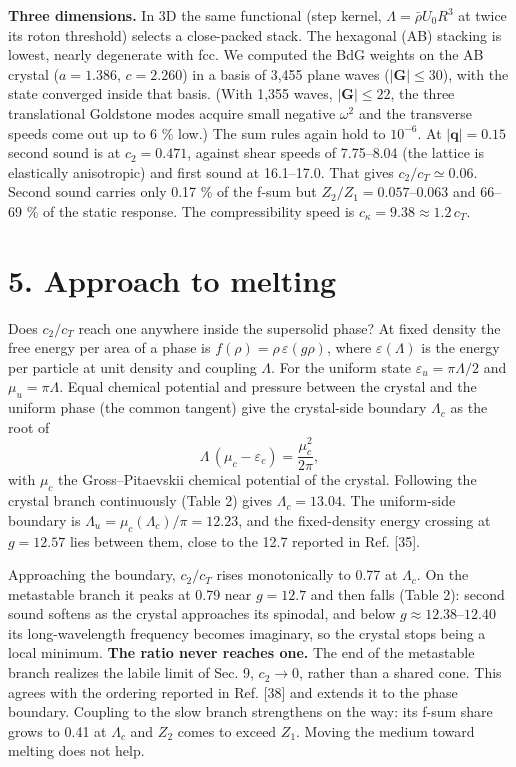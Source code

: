 \documentclass[
  11pt,
]{article}
\begin{document}
\textbf{Three dimensions.} In 3D the same functional (step kernel,
\(\Lambda=\bar\rho U_0R^3\) at twice its roton threshold) selects a
close-packed stack. The hexagonal (AB) stacking is lowest, nearly
degenerate with fcc. We computed the BdG weights on the AB crystal
(\(a=1.386\), \(c=2.260\)) in a basis of 3,455 plane waves
(\(|\mathbf G|\le30\)), with the state converged inside that basis.
(With 1,355 waves, \(|\mathbf G|\le22\), the three translational
Goldstone modes acquire small negative \(\omega^2\) and the transverse
speeds come out up to 6 \% low.) The sum rules again hold to
\(10^{-6}\). At \(|\mathbf q|=0.15\) second sound is at \(c_2=0.471\),
against shear speeds of 7.75--8.04 (the lattice is elastically
anisotropic) and first sound at 16.1--17.0. That gives
\(c_2/c_T\simeq0.06\). Second sound carries only 0.17 \% of the f-sum
but \(Z_2/Z_1=0.057\)--\(0.063\) and 66--69 \% of the static response.
The compressibility speed is \(c_\kappa=9.38\approx1.2\,c_T\).

\hypertarget{approach-to-melting}{%
\section{5. Approach to melting}\label{approach-to-melting}}

Does \(c_2/c_T\) reach one anywhere inside the supersolid phase? At
fixed density the free energy per area of a phase is
\(f(\rho)=\rho\,\varepsilon(g\rho)\), where \(\varepsilon(\Lambda)\) is
the energy per particle at unit density and coupling \(\Lambda\). For
the uniform state \(\varepsilon_u=\pi\Lambda/2\) and
\(\mu_u=\pi\Lambda\). Equal chemical potential and pressure between the
crystal and the uniform phase (the common tangent) give the crystal-side
boundary \(\Lambda_c\) as the root of
\[\Lambda\,(\mu_c-\varepsilon_c)=\frac{\mu_c^2}{2\pi},\] with \(\mu_c\)
the Gross--Pitaevskii chemical potential of the crystal. Following the
crystal branch continuously (Table 2) gives \(\Lambda_c=13.04\). The
uniform-side boundary is \(\Lambda_u=\mu_c(\Lambda_c)/\pi=12.23\), and
the fixed-density energy crossing at \(g=12.57\) lies between them,
close to the 12.7 reported in Ref. {[}35{]}.

Approaching the boundary, \(c_2/c_T\) rises monotonically to 0.77 at
\(\Lambda_c\). On the metastable branch it peaks at 0.79 near \(g=12.7\)
and then falls (Table 2): second sound softens as the crystal approaches
its spinodal, and below \(g\approx12.38\)--\(12.40\) its long-wavelength
frequency becomes imaginary, so the crystal stops being a local minimum.
\textbf{The ratio never reaches one.} The end of the metastable branch
realizes the labile limit of Sec. 9, \(c_2\to0\), rather than a shared
cone. This agrees with the ordering reported in Ref. {[}38{]} and
extends it to the phase boundary. Coupling to the slow branch
strengthens on the way: its f-sum share grows to 0.41 at \(\Lambda_c\)
and \(Z_2\) comes to exceed \(Z_1\). Moving the medium toward melting
does not help.
\end{document}
